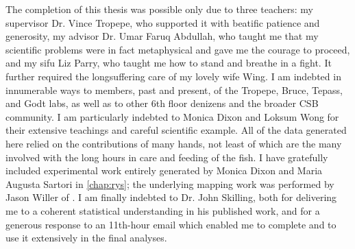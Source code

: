\documentclass{ut-thesis}
\begin{document}
\begin{preliminary}

\vspace{.5in}  %

\begin{acknowledgements}
The completion of this thesis was possible only due to three teachers: my supervisor Dr. Vince Tropepe, who supported it with beatific patience and generosity, my advisor Dr. Umar Faruq Abdullah, who taught me that my scientific problems were in fact metaphysical and gave me the courage to proceed, and my sifu Liz Parry, who taught me how to stand and breathe in a fight. It further required the longsuffering care of my lovely wife Wing. I am indebted in innumerable ways to members, past and present, of the Tropepe, Bruce, Tepass, and Godt labs, as well as to other 6th floor denizens and the broader CSB community. I am particularly indebted to Monica Dixon and Loksum Wong for their extensive teachings and careful scientific example. All of the data generated here relied on the contributions of many hands, not least of which are the many involved with the long hours in care and feeding of the fish. I have gratefully included experimental work entirely generated by Monica Dixon and Maria Augusta Sartori in \autoref{chap:rys}; the underlying mapping work was performed by Jason Willer of . I am finally indebted to Dr. John Skilling, both for delivering me to a coherent statistical understanding in his published work, and for a generous response to an 11th-hour email which enabled me to complete  and to use it extensively in the final analyses.
\end{acknowledgements}

\tableofcontents

\listoftables

\listoffigures


\end{preliminary}
\end{document}
